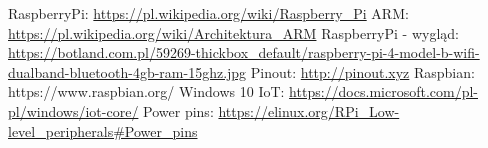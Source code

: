 \newpage
\begin{thebibliography}{9}
  RaspberryPi: \url{https://pl.wikipedia.org/wiki/Raspberry_Pi}
  ARM: \url{https://pl.wikipedia.org/wiki/Architektura_ARM}
  RaspberryPi - wygląd: \url{https://botland.com.pl/59269-thickbox_default/raspberry-pi-4-model-b-wifi-dualband-bluetooth-4gb-ram-15ghz.jpg}
  Pinout: \url{http://pinout.xyz}
  Raspbian: https://www.raspbian.org/
  Windows 10 IoT: \url{https://docs.microsoft.com/pl-pl/windows/iot-core/}
  Power pins: \url{https://elinux.org/RPi_Low-level_peripherals#Power_pins}
\end{thebibliography}